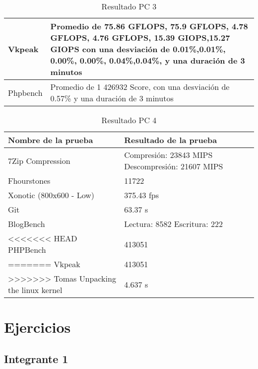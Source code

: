 \documentclass[12pt]{article}
\begin{document}
\begin{table}[!htb]
\begin{tabular}{|p{5cm}|p{9cm}|}
        \hline
        Vkpeak & Promedio de 75.86 GFLOPS, 75.9 GFLOPS, 4.78 GFLOPS, 4.76 GFLOPS, 15.39 GIOPS,15.27 GIOPS\newline
        con una desviación de 0.01\%,0.01\%, 0.00\%, 0.00\%, 0.04\%,0.04\%, \newline
        y una duración de 3 minutos \\
        \hline
        Phpbench & Promedio de 1 426932 Score, \newline
        con una desviación de 0.57\% \newline
        y una duración de 3 minutos \\
        \hline
    \end{tabular}
    \caption{Resultado PC 3}
\end{table}

\begin{table}[!htb]
    \centering
    \begin{tabular}{|p{5cm}|p{9cm}|}
        \hline
        \textbf{Nombre de la prueba} & \textbf{Resultado de la prueba}\\
        \hline
        7Zip Compression & Compresión: 23843 MIPS \newline 
        Descompresión: 21607 MIPS \\
        \hline
        Fhourstones & 11722 \\
        \hline
        Xonotic (800x600 - Low) &  375.43 fps\\
        \hline
        Git & 63.37 s\\
        \hline
        BlogBench & Lectura: 8582 \newline
        Escritura: 222 \\
        \hline
<<<<<<< HEAD
        PHPBench &  413051\\
=======
        Vkpeak &  413051\\
>>>>>>> Tomas
        \hline
        Unpacking the linux kernel & 4.637 s\\
        \hline
    \end{tabular}
    \caption{Resultado PC 4}
\end{table}

\newpage
\section{Ejercicios}
\subsection{Integrante 1}
\end{document}
